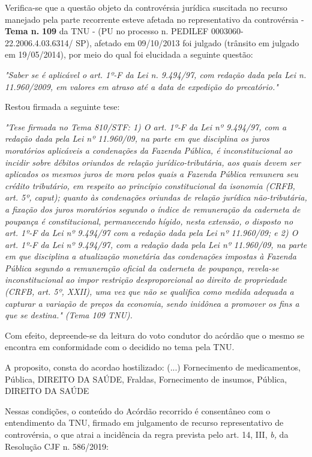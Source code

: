 \documentclass[12pt]{article}
\begin{document}
\justifying
\noindent Verifica-se que a questão objeto da controvérsia jurídica suscitada no recurso manejado pela parte recorrente esteve afetada no representativo da controvérsia - \textbf{Tema n. }\textbf{109} da TNU - (PU no processo n. PEDILEF 0003060-22.2006.4.03.6314/ SP),  afetado em 09/10/2013 foi julgado (trânsito em julgado em 19/05/2014), por meio do qual foi elucidada a seguinte questão:

\noindent \textit{"Saber se é aplicável o art. 1º-F da Lei n. 9.494/97, com redação dada pela Lei n. 11.960/2009, em valores em atraso até a data de expedição do precatório."}

\noindent Restou firmada a seguinte tese:

\noindent \textit{"Tese firmada no Tema 810/STF: 1) O art. 1º-F da Lei nº 9.494/97, com a redação dada pela Lei nº 11.960/09, na parte em que disciplina os juros moratórios aplicáveis a condenações da Fazenda Pública, é inconstitucional ao incidir sobre débitos oriundos de relação jurídico-tributária, aos quais devem ser aplicados os mesmos juros de mora pelos quais a Fazenda Pública remunera seu crédito tributário, em respeito ao princípio constitucional da isonomia (CRFB, art. 5º, caput); quanto às condenações oriundas de relação jurídica não-tributária, a fixação dos juros moratórios segundo o índice de remuneração da caderneta de poupança é constitucional, permanecendo hígido, nesta extensão, o disposto no art. 1º-F da Lei nº 9.494/97 com a redação dada pela Lei nº 11.960/09; e 2) O art. 1º-F da Lei nº 9.494/97, com a redação dada pela Lei nº 11.960/09, na parte em que disciplina a atualização monetária das condenações impostas à Fazenda Pública segundo a remuneração oficial da caderneta de poupança, revela-se inconstitucional ao impor restrição desproporcional ao direito de propriedade (CRFB, art. 5º, XXII), uma vez que não se qualifica como medida adequada a capturar a variação de preços da economia, sendo inidônea a promover os fins a que se destina." (Tema 109 TNU).}

\noindent Com efeito, depreende-se da leitura do voto condutor do acórdão que o mesmo se encontra em conformidade com o decidido no  tema pela TNU.

\noindent A proposito, consta do acordao hostilizado: (...) Fornecimento de medicamentos, Pública, DIREITO DA SAÚDE, Fraldas, Fornecimento de insumos, Pública, DIREITO DA SAÚDE

\noindent Nessas condições, o conteúdo do Acórdão recorrido é consentâneo com o entendimento da TNU, firmado em julgamento de recurso representativo de controvérsia, o que atrai a incidência da regra prevista pelo art. 14, III, \textit{b,} da Resolução CJF n. 586/2019:
\end{document}
